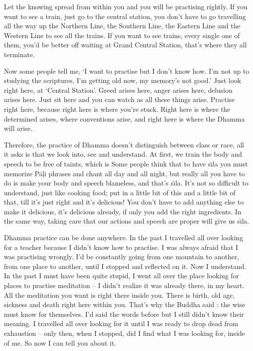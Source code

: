 Let the knowing spread from within you and you will be practising rightly. If you want to see a train, just go to the central station, you don't have to go travelling all the way up the Northern Line, the Southern Line, the Eastern Line and the Western Line to see all the trains. If you want to see trains, every single one of them, you'd be better off waiting at Grand Central Station, that's where they all terminate. 

Now some people tell me, `I want to practise but I don't know how. I'm not up to studying the scriptures, I'm getting old now, my memory's not good.' Just look right here, at `Central Station'. Greed arises here, anger arises here, delusion arises here. Just sit here and you can watch as all these things arise. Practise right here, because right here is where you're stuck. Right here is where the determined arises, where conventions arise, and right here is where the Dhamma will arise. 

Therefore, the practice of Dhamma doesn't distinguish between class or race, all it asks is that we look into, see and understand. At first, we train the body and speech to be free of taints, which is  Some people think that to have s\={\i}la you must memorize P\=a\d{l}i phrases and chant all day and all night, but really all you have to do is make your body and speech blameless, and that's s\={\i}la. It's not so difficult to understand, just like cooking food; put in a little bit of this and a little bit of that, till it's just right and it's delicious! You don't have to add anything else to make it delicious, it's delicious already, if only you add the right ingredients. In the same way, taking care that our actions and speech are proper will give us s\={\i}la. 

Dhamma practice can be done anywhere. In the past I travelled all over looking for a teacher because I didn't know how to practise. I was always afraid that I was practising wrongly. I'd be constantly going from one mountain to another, from one place to another, until I stopped and reflected on it. Now I understand. In the past I must have been quite stupid, I went all over the place looking for places to practise meditation -- I didn't realize it was already there, in my heart. All the meditation you want is right there inside you. There is birth, old age, sickness and death right here within you. That's why the Buddha said : the wise must know for themselves. I'd said the words before but I still didn't know their meaning. I travelled all over looking for it until I was ready to drop dead from exhaustion -- only then, when I stopped, did I find what I was looking for, inside of me. So now I can tell you about it. 

